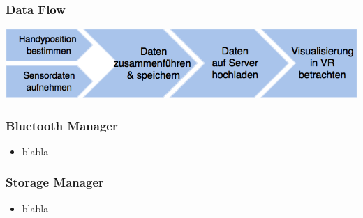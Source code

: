 \documentclass{beamer}
\begin{document}
\begin{frame}
\frametitle{Data Flow}
\begin{center}
	\includegraphics[width=\textwidth]{diagram/dataflow.png}
\end{center}
\end{frame}



\begin{frame}
\frametitle{Bluetooth Manager}
\begin{itemize}
  \item blabla
\end{itemize}
\end{frame}

\begin{frame}
\frametitle{Storage Manager}
\begin{itemize}
  \item blabla
\end{itemize}
\end{frame}
\end{document}
